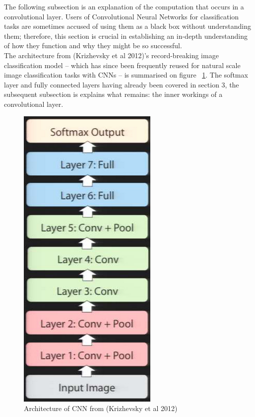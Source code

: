 \documentclass[a4paper,11pt]{article}
\begin{document}
The following subsection is an explanation of the computation that occurs in a convolutional layer. Users of Convolutional Neural Networks for classification tasks are sometimes accused of using them as a black box without understanding them; therefore, this section is crucial in establishing an in-depth understanding of how they function and why they might be so successful. \\

The architecture from (Krizhevsky et al 2012)'s record-breaking image classification model -- which has since been frequently reused for natural scale image classification tasks with CNNs \cite{rectifier} \cite{goodfellow_street_view} \cite{decaf} \cite{fergus_tutorial} \cite{colah} \cite{zeiler_fergus} \cite{transfer-learning} \cite{caffe-website}  -- is summarised on figure ~\ref{f18}. The softmax layer and fully connected layers having already been covered in section 3, the subsequent subsection is explains what remains: the inner workings of a convolutional layer. \\

\begin{figure}[h!]
	\centering
	\includegraphics[scale=0.3]{images/alexnet_architecture_simple.png}
	\caption{Architecture of CNN from (Krizhevsky et al 2012)}
    \label{f18}
\end{figure}
\end{document}
